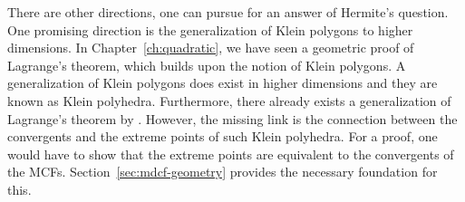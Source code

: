 There are other directions, one can pursue for an answer of Hermite's question.
One promising direction is the generalization of Klein polygons to higher dimensions.
In Chapter~\ref{ch:quadratic},
we have seen a geometric proof of Lagrange's theorem,
which builds upon the notion of Klein polygons.
A generalization of Klein polygons does exist in higher dimensions
and they are known as Klein polyhedra.
Furthermore, there already exists a generalization of Lagrange's theorem by \citeauthor{German08}.
However, the missing link is the connection between the convergents and the
extreme points of such Klein polyhedra.
For a proof, one would have to show that the extreme points are equivalent to
the convergents of the MCFs.
Section~\ref{sec:mdcf-geometry} provides the necessary foundation for this.

